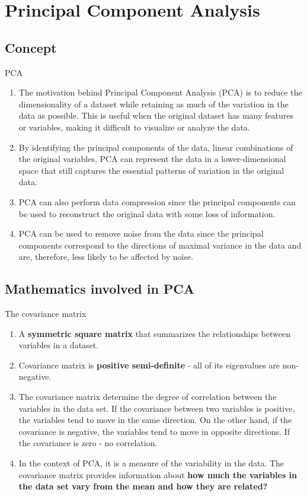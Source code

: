 \documentclass{beamer}
\begin{document}
\section{Principal Component Analysis}
\subsection{Concept}

\begin{frame}{PCA}
    \begin{enumerate}
        \item The motivation behind Principal Component Analysis (PCA) is to reduce the dimensionality of a dataset while retaining as much of the variation in the data as possible. This is useful when the original dataset has many features or variables, making it difficult to visualize or analyze the data.
        \item By identifying the principal components of the data, linear combinations of the original variables, PCA can represent the data in a lower-dimensional space that still captures the essential patterns of variation in the original data.
        \item PCA can also perform data compression since the principal components can be used to reconstruct the original data with some loss of information.
        \item PCA can be used to remove noise from the data since the principal components correspond to the directions of maximal variance in the data and are, therefore, less likely to be affected by noise.
    \end{enumerate}
\end{frame}

\subsection{Mathematics involved in PCA}
\begin{frame}{The covariance matrix}
    \begin{enumerate}
        \item A \textbf{symmetric square matrix} that summarizes the relationships between variables in a dataset.
        \item Covariance matrix is \textbf{positive semi-definite} - all of its eigenvalues are non-negative.
        \item The covariance matrix determine the degree of correlation between the variables in the data set. If the covariance between two variables is positive, the variables tend to move in the same direction. On the other hand, if the covariance is negative, the variables tend to move in opposite directions. If the covariance is zero - no correlation.
        \item In the context of PCA, it is a measure of the variability in the data. The covariance matrix provides information about \textbf{how much the variables in the data set vary from the mean and how they are related?}
    \end{enumerate}
\end{frame}
\end{document}
